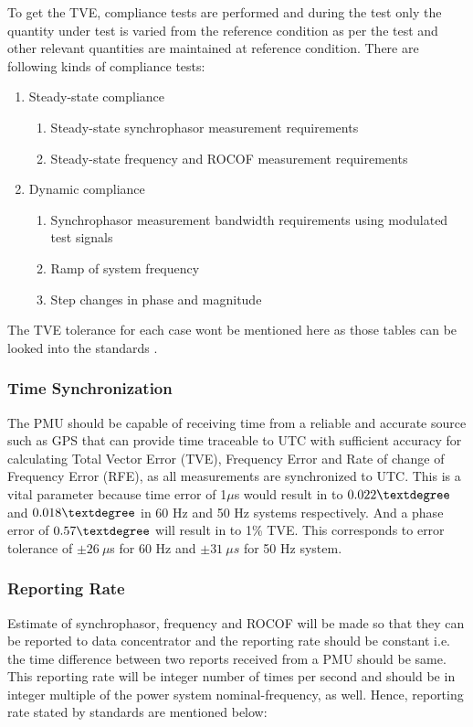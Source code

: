 To get the TVE, compliance tests are performed and during the test only the quantity under test is varied from the reference condition as per the test and other relevant quantities are maintained at reference condition. There are following kinds of compliance tests:
\begin{enumerate}
	\item Steady-state compliance
	\begin{enumerate}
		\item Steady-state synchrophasor measurement requirements
		\item Steady-state frequency and ROCOF measurement requirements
	\end{enumerate}
	\item Dynamic compliance
	\begin{enumerate}
		\item Synchrophasor measurement bandwidth requirements using modulated test signals
		\item Ramp of system frequency
		\item Step changes in phase and magnitude
	\end{enumerate}
\end{enumerate} 
The TVE tolerance for each case wont be mentioned here as those tables can be looked into the standards \cite{c37.118}.


\subsubsection{Time Synchronization}

The PMU should be capable of receiving time from a reliable and accurate source such as GPS that can provide time traceable to UTC with sufficient accuracy for calculating Total Vector Error (TVE), Frequency Error and Rate of change of Frequency Error (RFE), as all measurements are synchronized to UTC. This is a vital parameter because time error of 1$\mu$s would result in to $0.022\textdegree$  and $0.018\textdegree$ in 60 Hz and 50 Hz systems respectively. And a phase error of $0.57\textdegree$ will result in to 1\% TVE. This corresponds to error tolerance of $\pm26 ~\mu$s for 60 Hz and $\pm 31 ~\mu s$ for 50 Hz system.

\subsubsection{Reporting Rate}
Estimate of synchrophasor, frequency and ROCOF will be made so that they can be reported to data concentrator and the reporting rate should be constant i.e. the time difference between two reports received from a PMU should be same. This reporting rate will be integer number of times per second and should be in integer multiple of the power system nominal-frequency, as well. Hence, reporting rate stated by standards are mentioned below:


